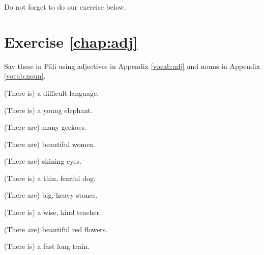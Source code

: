 
Do not forget to do our exercise below.

\section*{Exercise \ref{chap:adj}}
Say these in P\=ali using adjectives in Appendix \ref{vocab:adj} and nouns in Appendix \ref{vocab:noun}.
\begin{compactenum}
\item (There is) a difficult language.
\item (There is) a young elephant.
\item (There are) many geckoes.
\item (There are) beautiful women.
\item (There are) shining eyes.
\item (There is) a thin, fearful dog.
\item (There are) big, heavy stones.
\item (There is) a wise, kind teacher.
\item (There are) beautiful red flowers.
\item (There is) a fast long train.
\end{compactenum}
